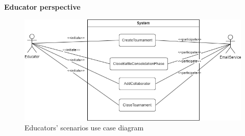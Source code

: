 \textbf{Educator perspective}
\begin{figure}[H]
    \includegraphics[scale=0.5]{Diagrams/use_case_educator.png}
    \caption{Educators' scenarios use case diagram}
\end{figure}
